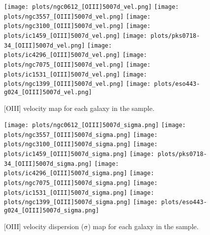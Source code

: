 \documentclass[fleqn,usenatbib,useAMS]{mnras}
\begin{document}
        \begin{figure*}
            \centering
            \texttt{[image: plots/ngc0612\_[OIII]5007d\_vel.png]}
            \texttt{[image: plots/ngc3557\_[OIII]5007d\_vel.png]}
            \texttt{[image: plots/ngc3100\_[OIII]5007d\_vel.png]}
            \texttt{[image: plots/ic1459\_[OIII]5007d\_vel.png]}
            \texttt{[image: plots/pks0718-34\_[OIII]5007d\_vel.png]}
            \texttt{[image: plots/ic4296\_[OIII]5007d\_vel.png]}
            \texttt{[image: plots/ngc7075\_[OIII]5007d\_vel.png]}
            \texttt{[image: plots/ic1531\_[OIII]5007d\_vel.png]}
            \texttt{[image: plots/ngc1399\_[OIII]5007d\_vel.png]}
            \texttt{[image: plots/eso443-g024\_[OIII]5007d\_vel.png]}
            \caption{[OIII] velocity map for each galaxy in the sample.}
            \label{fig:OIII_vel}
        \end{figure*}


        \begin{figure*}
            \centering
            \texttt{[image: plots/ngc0612\_[OIII]5007d\_sigma.png]}
            \texttt{[image: plots/ngc3557\_[OIII]5007d\_sigma.png]}
            \texttt{[image: plots/ngc3100\_[OIII]5007d\_sigma.png]}
            \texttt{[image: plots/ic1459\_[OIII]5007d\_sigma.png]}
            \texttt{[image: plots/pks0718-34\_[OIII]5007d\_sigma.png]}
            \texttt{[image: plots/ic4296\_[OIII]5007d\_sigma.png]}
            \texttt{[image: plots/ngc7075\_[OIII]5007d\_sigma.png]}
            \texttt{[image: plots/ic1531\_[OIII]5007d\_sigma.png]}
            \texttt{[image: plots/ngc1399\_[OIII]5007d\_sigma.png]}
            \texttt{[image: plots/eso443-g024\_[OIII]5007d\_sigma.png]}
            \caption{[OIII] velocity dispersion ($\mathrm{\sigma}$) map for each galaxy in the sample.}
            \label{fig:OIII_sigma}
        \end{figure*}
\end{document}
